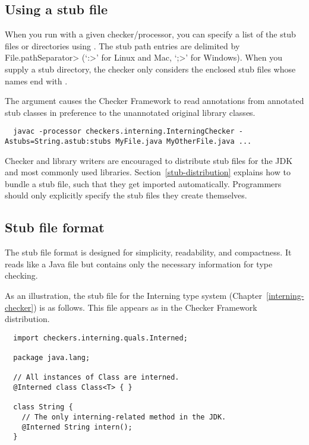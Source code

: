 \subsection{Using a stub file\label{stub-using}}

  When you run  with a given checker/processor, you can specify
  a list of the stub files or directories using
  .  The stub path entries
  are delimited by
  \<File.pathSeparator> (`\<:>' for Linux and Mac, `\<;>' for Windows).
  When you supply a stub directory, the checker only considers the enclosed
  stub files whose names end with .

  The  argument causes the Checker Framework to read annotations
  from annotated stub classes in preference to the unannotated original
  library classes.

\begin{smaller}
\begin{Verbatim}
  javac -processor checkers.interning.InterningChecker -Astubs=String.astub:stubs MyFile.java MyOtherFile.java ...
\end{Verbatim}
\end{smaller}

Checker and library writers are encouraged to distribute stub files for the
JDK and most commonly used libraries.  Section~\ref{stub-distribution}
explains how to bundle a stub file, such that they get imported automatically.
Programmers should only explicitly specify the stub files they create
themselves.

\subsection{Stub file format\label{stub-format}}

The stub file format is designed for simplicity, readability, and
compactness.  It reads like a Java file but contains only the
necessary information for type checking.

As an illustration, the stub file for the Interning type system
(Chapter~\ref{interning-checker}) is as follows.  This file appears as
 in the Checker Framework
distribution.

\begin{Verbatim}
  import checkers.interning.quals.Interned;

  package java.lang;

  // All instances of Class are interned.
  @Interned class Class<T> { }

  class String {
    // The only interning-related method in the JDK.
    @Interned String intern();
  }
\end{Verbatim}


